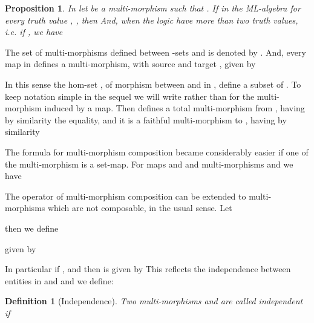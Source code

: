 \documentclass[oribibl]{llncs}
\newtheorem{prop}{Proposition}
\newtheorem{defn}{Definition}
\begin{document}
\begin{prop}\label{prop:comprestriction} In  let  be a multi-morphism such that . If in the ML-algebra  for every truth value , , then  And, when the logic have more than two truth values, i.e. if , we have

\end{prop}

The set of multi-morphisms defined between -sets  and  is denoted by . And, every map  in  defines a multi-morphism, with source  and target , given by

In this sense the hom-set , of morphism between  and  in , define a subset of . To keep notation simple in the sequel we will write  rather than  for the multi-morphism induced by a map. Then  defines a total multi-morphism from , having by similarity the equality, and it is a faithful multi-morphism to , having by similarity


The formula for multi-morphism composition became considerably easier if one of the multi-morphism is a set-map. For maps  and  and multi-morphisms  and  we have

The operator of multi-morphism composition can be extended to multi-morphisms which are not composable, in the usual sense. Let

then we define

given by

In particular if ,  and  then  is given by  This reflects the independence between entities in  and  and we define:

\begin{defn}[Independence]
Two multi-morphisms  and  are called independent if

\end{defn}
\end{document}
